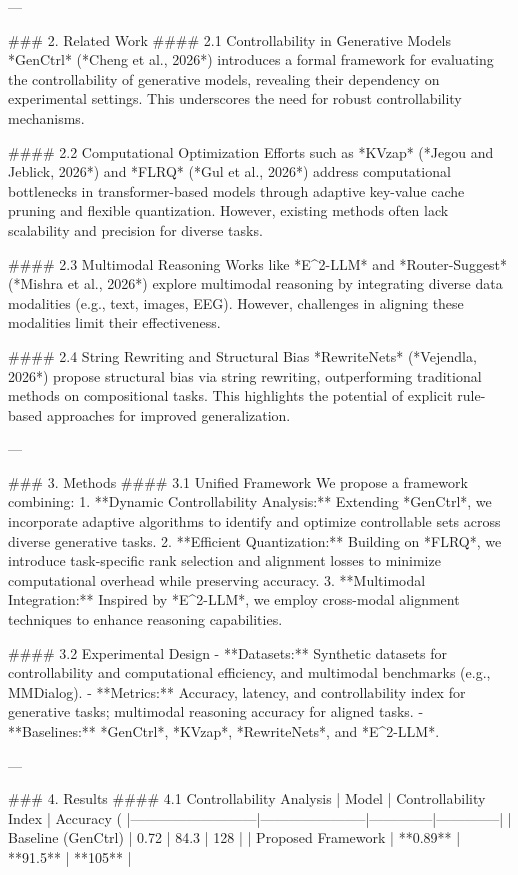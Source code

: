 ---

### 2. Related Work
#### 2.1 Controllability in Generative Models
*GenCtrl* (*Cheng et al., 2026*) introduces a formal framework for evaluating the controllability of generative models, revealing their dependency on experimental settings. This underscores the need for robust controllability mechanisms.

#### 2.2 Computational Optimization
Efforts such as *KVzap* (*Jegou and Jeblick, 2026*) and *FLRQ* (*Gul et al., 2026*) address computational bottlenecks in transformer-based models through adaptive key-value cache pruning and flexible quantization. However, existing methods often lack scalability and precision for diverse tasks.

#### 2.3 Multimodal Reasoning
Works like *E^2-LLM* and *Router-Suggest* (*Mishra et al., 2026*) explore multimodal reasoning by integrating diverse data modalities (e.g., text, images, EEG). However, challenges in aligning these modalities limit their effectiveness.

#### 2.4 String Rewriting and Structural Bias
*RewriteNets* (*Vejendla, 2026*) propose structural bias via string rewriting, outperforming traditional methods on compositional tasks. This highlights the potential of explicit rule-based approaches for improved generalization.

---

### 3. Methods
#### 3.1 Unified Framework
We propose a framework combining:
1. **Dynamic Controllability Analysis:** Extending *GenCtrl*, we incorporate adaptive algorithms to identify and optimize controllable sets across diverse generative tasks.
2. **Efficient Quantization:** Building on *FLRQ*, we introduce task-specific rank selection and alignment losses to minimize computational overhead while preserving accuracy.
3. **Multimodal Integration:** Inspired by *E^2-LLM*, we employ cross-modal alignment techniques to enhance reasoning capabilities.

#### 3.2 Experimental Design
- **Datasets:** Synthetic datasets for controllability and computational efficiency, and multimodal benchmarks (e.g., MMDialog).
- **Metrics:** Accuracy, latency, and controllability index for generative tasks; multimodal reasoning accuracy for aligned tasks.
- **Baselines:** *GenCtrl*, *KVzap*, *RewriteNets*, and *E^2-LLM*.

---

### 4. Results
#### 4.1 Controllability Analysis
| Model                     | Controllability Index | Accuracy (%
|---------------------------|-----------------------|--------------|--------------|
| Baseline (GenCtrl)        | 0.72                 | 84.3         | 128          |
| Proposed Framework        | **0.89**             | **91.5**     | **105**      |

